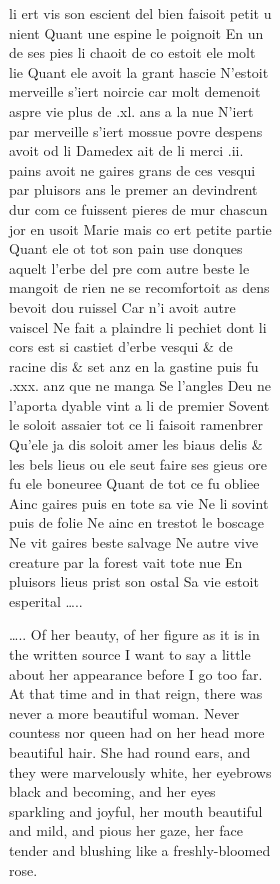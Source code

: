 \documentclass[
  letterpaper,
  DIV=11,
  numbers=noendperiod,
  oneside]{scrreprt}
\begin{document}
\begin{figure}
\begin{figure}
\begin{figure}
\begin{minipage}{0.20\linewidth}
li ert vis son escient del bien faisoit {petit u nient} {Quant une
espine le poignoit} {En un de ses pies li chaoit} de co estoit ele molt
lie Quant ele avoit la grant hascie {N'estoit merveille} s'iert
{noircie} car molt demenoit aspre vie plus de .xl. ans a la nue {N'iert
par merveille} s'iert mossue povre despens avoit od li {Damedex} ait de
li merci .ii. pains avoit {ne gaires grans} de ces vesqui par pluisors
ans le premer an devindrent dur com ce fuissent pieres de mur chascun
jor en usoit Marie mais co ert petite partie Quant ele ot tot son pain
use donques aquelt l'erbe del pre com autre beste le mangoit {de rien
ne} se recomfortoit as dens bevoit dou ruissel Car {n'}i avoit autre
vaiscel {Ne} fait a plaindre li pechiet dont li cors est si castiet
d'erbe vesqui \& de racine dis \& set anz en la gastine puis fu .xxx.
anz {que ne} manga Se l'angles Deu ne l'aporta dyable vint a li de
premier Sovent le soloit assaier tot ce li faisoit ramenbrer Qu'ele ja
dis soloit amer les biaus delis \& les bels lieus ou ele seut faire ses
gieus ore fu ele boneuree Quant de tot ce fu obliee Ainc gaires puis en
tote sa vie {Ne} li sovint {puis} de folie {Ne ainc} en trestot le
boscage {Ne} vit {gaires} beste salvage {Ne} autre vive creature par la
forest vait {tote nue} En pluisors lieus prist son ostal Sa vie estoit
esperital \ldots..

\ldots.. Of her beauty, of her figure as it is in the written source I
want to say a little about her appearance before I go too far. At that
time and in that reign, there was {never} a more beautiful woman.
{Never} countess {nor} queen {had} on her head more beautiful hair. She
had round ears, and they were marvelously {white,} her eyebrows {black}
and becoming, and her eyes {sparkling} and joyful, her mouth beautiful
and mild, and pious her gaze, her face tender and {blushing} {like a
freshly-bloomed rose.}


\end{minipage}
\end{figure}
\end{figure}
\end{figure}
\end{document}
